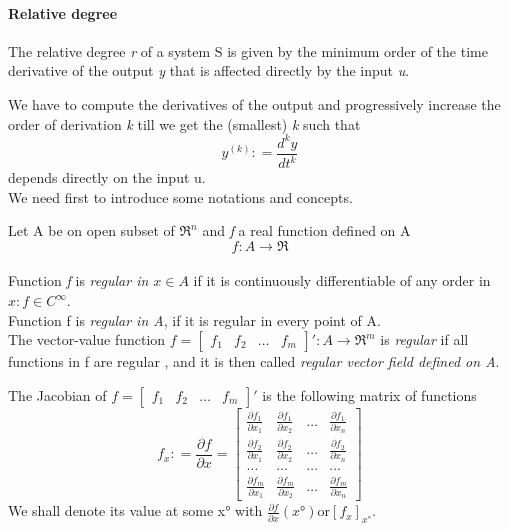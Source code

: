 \paragraph{Relative degree}
\begin{defn}
	The relative degree \emph{r} of a system S is given by the minimum order of the time derivative of the output \emph{y} that is affected directly by the input \emph{u}.
\end{defn}
We have to compute the derivatives of the output and progressively increase the order of derivation \emph{k} till we get the (smallest) \emph{k} such that \[y^{(k)}\colon=\frac{d^ky}{dt^k}\] depends directly on the input u.\\We need first to introduce some notations and concepts.
\begin{defn}
	Let A be on open subset of $\Re^n$ and \emph{f} a real function defined on A\[f\colon A\to\Re\]\\ Function \emph{f} is \emph{regular in $x \in A$} if it is continuously differentiable of any order in $x\colon f \in C^\infty$.\\Function f is \emph{regular in A}, if it is regular in every point of A.\\The vector-value function $f=\begin{bmatrix}
			f_1 & f_2 & \dots & f_m
		\end{bmatrix}'\colon A \to \Re^m$ is \emph{regular} if all functions in f are regular , and it is then called \emph{regular vector field defined on A}.
\end{defn}
\begin{defn}[Jacobian]
	The Jacobian of $f=\begin{bmatrix}
		f_1 & f_2 & \dots & f_m
	\end{bmatrix}'$ is the following matrix of functions 
\[
f_x\colon=\frac{\partial f}{\partial x}=
\begin{bmatrix}
	\frac{\partial f_1}{\partial x_1} & \frac{\partial f_1}{\partial x_2} & \dots & \frac{\partial f_1}{\partial x_n}\\
	\frac{\partial f_2}{\partial x_1} & \frac{\partial f_2}{\partial x_2} & \dots & \frac{\partial f_2}{\partial x_n}\\
	\dots & \dots & \dots & \dots \\
	\frac{\partial f_m}{\partial x_1} & \frac{\partial f_m}{\partial x_2} & \dots & \frac{\partial f_m}{\partial x_n}
\end{bmatrix}
\] We shall denote its value at some x° with $\frac{\partial f}{\partial x}(x°) \text{or} [f_x]_{x°}$.
\end{defn}
